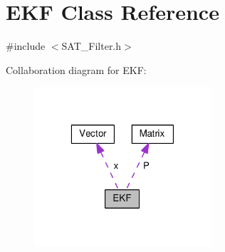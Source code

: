 \hypertarget{classEKF}{\section{E\-K\-F Class Reference}
\label{classEKF}
}


{\ttfamily \#include $<$S\-A\-T\-\_\-\-Filter.\-h$>$}



Collaboration diagram for E\-K\-F\-:\nopagebreak
\begin{figure}[H]
\begin{center}
\leavevmode
\includegraphics[width=187pt]{classEKF__coll__graph}
\end{center}
\end{figure}

